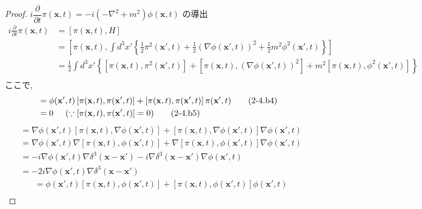 \documentclass[a4paper,12pt]{article}
\begin{document}
\begin{proof}
$i \dfrac{\partial}{\partial t} \pi(\mathbf{x}, t) = -i(-\nabla^2 + m^2) \phi(\mathbf{x}, t)$ の導出
\begin{align*}
  i \frac{\partial}{\partial t} \pi(\mathbf{x}, t) &= \left[ \pi(\mathbf{x}, t), H \right] \tag{2-4.b1}\\
  &= \left[ \pi(\mathbf{x}, t), \int d^3 x' \left\{ \frac{1}{2} \pi^2 (\mathbf{x}', t) + \frac{1}{2}(\nabla \phi(\mathbf{x}', t))^2 + \frac{1}{2}m^2 \phi^2(\mathbf{x}', t) \right\}\right] \tag{2-4.b2}\\
  &= \frac{1}{2}\int d^3 x' \left\{ [\pi(\mathbf{x}, t), \pi^2 (\mathbf{x}', t)] + [\pi(\mathbf{x}, t), (\nabla \phi(\mathbf{x}', t))^2] + m^2 [\pi(\mathbf{x}, t), \phi^2(\mathbf{x}', t)] \right\} \label{2-4.b3}\tag{2-4.b3}\\
\end{align*}
ここで,
\begin{align*}
  [\pi(\mathbf{x}, t), \pi^2 (\mathbf{x}', t)] &= \phi(\mathbf{x}', t) \left[ \pi(\mathbf{x}, t), \pi(\mathbf{x}', t) \right] + \left[ \pi(\mathbf{x}, t), \pi(\mathbf{x}', t) \right] \pi(\mathbf{x}', t) \tag{2-4.b4}\\
  &= 0 \hspace{0.5cm} (\because [\pi(\mathbf{x}, t), \pi(\mathbf{x}', t)] = 0) \tag{2-4.b5}
\end{align*}
\begin{align*}
  [\pi(\mathbf{x}, t), (\nabla \phi(\mathbf{x}', t))^2] &= \nabla \phi(\mathbf{x}', t) \left[ \pi(\mathbf{x}, t), \nabla \phi(\mathbf{x}', t) \right] + \left[ \pi(\mathbf{x}, t), \nabla \phi(\mathbf{x}', t) \right] \nabla \phi(\mathbf{x}', t) \tag{2-4.b7}\\
  &= \nabla \phi(\mathbf{x}', t) \nabla \left[ \pi(\mathbf{x}, t), \phi(\mathbf{x}', t) \right] + \nabla \left[ \pi(\mathbf{x}, t), \phi(\mathbf{x}', t) \right] \nabla \phi(\mathbf{x}', t) \tag{2-4.b8}\\
   &= -i\nabla \phi(\mathbf{x}', t) \nabla \delta^3(\mathbf{x} - \mathbf{x}') - i\nabla \delta^3(\mathbf{x} - \mathbf{x}') \nabla \phi(\mathbf{x}', t) \tag{2-4.b9}\\
   &= -2i \nabla \phi(\mathbf{x}', t) \nabla \delta^3(\mathbf{x} - \mathbf{x}') \tag{2-4.b10}
\end{align*}
\begin{align*}
  [\pi(\mathbf{x}, t), \phi^2(\mathbf{x}', t)] &= \phi(\mathbf{x}', t) \left[ \pi(\mathbf{x}, t), \phi(\mathbf{x}', t) \right] + \left[ \pi(\mathbf{x}, t), \phi(\mathbf{x}', t) \right] \phi(\mathbf{x}', t) \tag{2-4.b11}\\

\end{align*}
\end{proof}
\end{document}

